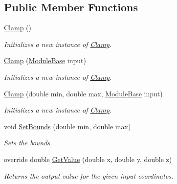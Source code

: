 \subsection*{Public Member Functions}
\begin{DoxyCompactItemize}
\item 
\hyperlink{class_lib_noise_1_1_operator_1_1_clamp_a13a7288833564c65f58f82029fb53048}{Clamp} ()
\begin{DoxyCompactList}\small\item\em Initializes a new instance of \hyperlink{class_lib_noise_1_1_operator_1_1_clamp}{Clamp}. \end{DoxyCompactList}\item 
\hyperlink{class_lib_noise_1_1_operator_1_1_clamp_ab0c3f29719f6da18bda9b70fe3a463a2}{Clamp} (\hyperlink{class_lib_noise_1_1_module_base}{Module\+Base} input)
\begin{DoxyCompactList}\small\item\em Initializes a new instance of \hyperlink{class_lib_noise_1_1_operator_1_1_clamp}{Clamp}. \end{DoxyCompactList}\item 
\hyperlink{class_lib_noise_1_1_operator_1_1_clamp_a2e7089d48d90c66b77e6c116f0cb44e4}{Clamp} (double min, double max, \hyperlink{class_lib_noise_1_1_module_base}{Module\+Base} input)
\begin{DoxyCompactList}\small\item\em Initializes a new instance of \hyperlink{class_lib_noise_1_1_operator_1_1_clamp}{Clamp}. \end{DoxyCompactList}\item 
void \hyperlink{class_lib_noise_1_1_operator_1_1_clamp_a6df7b18204f0bc461292957a1b57918b}{Set\+Bounds} (double min, double max)
\begin{DoxyCompactList}\small\item\em Sets the bounds. \end{DoxyCompactList}\item 
override double \hyperlink{class_lib_noise_1_1_operator_1_1_clamp_aa9b88bce92a24ba0d6fbb58fd8a1d44f}{Get\+Value} (double x, double y, double z)
\begin{DoxyCompactList}\small\item\em Returns the output value for the given input coordinates. \end{DoxyCompactList}\end{DoxyCompactItemize}
